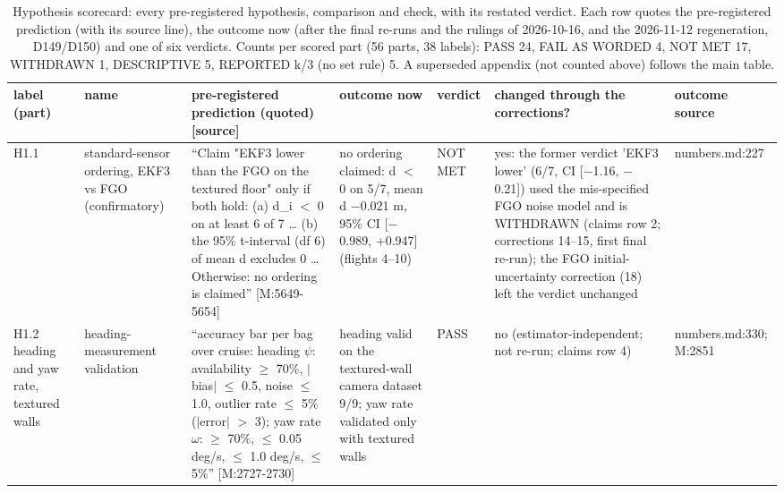 \begin{table}[htbp]
\centering
\scriptsize
\caption{Hypothesis scorecard: every pre-registered hypothesis, comparison and check, with its restated verdict. Each row quotes the pre-registered prediction (with its source line), the outcome now (after the final re-runs and the rulings of 2026-10-16, and the 2026-11-12 regeneration, D149/D150) and one of six verdicts. Counts per scored part (56 parts, 38 labels): PASS 24, FAIL AS WORDED 4, NOT MET 17, WITHDRAWN 1, DESCRIPTIVE 5, REPORTED k/3 (no set rule) 5. A superseded appendix (not counted above) follows the main table.}
\label{tab:R1_hypothesis_scorecard}
\begin{tabular}{p{}p{}p{}p{}p{}p{}p{}}
\toprule
label (part) & name & pre-registered prediction (quoted) [source] & outcome now & verdict & changed through the corrections? & outcome source \\
\midrule
H1.1 & standard-sensor ordering, EKF3 vs FGO (confirmatory) & ``Claim "EKF3 lower than the FGO on the textured floor" only if both hold: (a) d\_i $<$ 0 on at least 6 of 7 \ldots{} (b) the 95\% t-interval (df 6) of mean d excludes 0 \ldots{} Otherwise: no ordering is claimed'' [M:5649-5654] & no ordering claimed: d $<$ 0 on 5/7, mean d $-$0.021 m, 95\% CI [$-$0.989, +0.947] (flights 4--10) & NOT MET & yes: the former verdict 'EKF3 lower' (6/7, CI [$-$1.16, $-$0.21]) used the mis-specified FGO noise model and is WITHDRAWN (claims row 2; corrections 14--15, first final re-run); the FGO initial-uncertainty correction (18) left the verdict unchanged & numbers.md:227 \\
H1.2 heading and yaw rate, textured walls & heading-measurement validation & ``accuracy bar per bag over cruise: heading $\psi$: availability $\ge$ 70\%, $|$bias$|$ $\le$ 0.5\textdegree{}, noise $\le$ 1.0\textdegree{}, outlier rate $\le$ 5\% ($|$error$|$ $>$ 3\textdegree{}); yaw rate $\omega$: $\ge$ 70\%, $\le$ 0.05 deg/s, $\le$ 1.0 deg/s, $\le$ 5\%'' [M:2727-2730] & heading valid on the textured-wall camera dataset 9/9; yaw rate validated only with textured walls & PASS & no (estimator-independent; not re-run; claims row 4) & numbers.md:330; M:2851 \\

\end{tabular}
\end{table}
